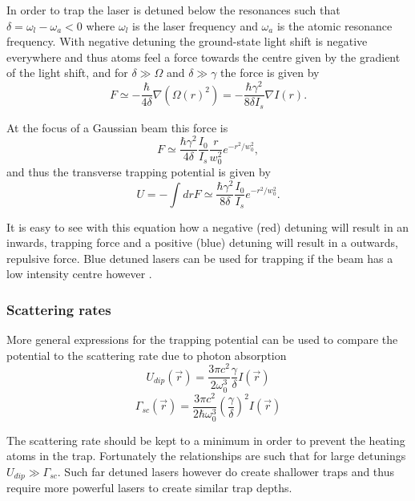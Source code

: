 In order to trap the laser is detuned below the resonances such that $\delta = \omega_l - \omega_a < 0$ where $\omega_l$ is the laser frequency and $\omega_a$ is the atomic resonance frequency. With negative detuning the ground-state light shift is negative everywhere and thus atoms feel a force towards the centre given by the gradient of the light shift, and for $\delta \gg \Omega$ and $\delta \gg \gamma$ the force is given by
\begin{equation}
F \simeq - \frac{\hbar}{4\delta} \nabla(\Omega(r)^2) = -\frac{\hbar \gamma^2}{8\delta I_s} \nabla I (r).
\end{equation}

At the focus of a Gaussian beam this force is
\begin{equation}
F \simeq \frac{\hbar \gamma^2}{4 \delta} \frac{I_0}{I_s} \frac{r}{w_0^2} e^{-r^2/w_0^2},
\end{equation}
and thus the transverse trapping potential is given by
\begin{equation}
U = -\int dr F \simeq \frac{\hbar \gamma^2}{8\delta} \frac{I_0}{I_s} e^{-r^2/w_0^2}.
\end{equation}

It is easy to see with this equation how a negative (red) detuning will result in an inwards, trapping force and a positive (blue) detuning will result in a outwards, repulsive force. Blue detuned lasers can be used for trapping if the beam has a low intensity centre however \cite{davidson_long_1995, lee_raman_1996, ozeri_long_1999, friedman_compression_2000}.

\subsubsection{Scattering rates}
More general expressions for the trapping potential can be used to compare the potential to the scattering rate due to photon absorption \cite{grimm_optical_2000}
\begin{equation}
U_{dip}(\vec{r})=\frac{3\pi c^2}{2\omega_0^3} \frac{\gamma}{\delta} I(\vec{r})
\end{equation}
\begin{equation}
\Gamma_{sc}(\vec{r})=\frac{3\pi c^2}{2\hbar \omega_0^3}\left(\frac{\gamma}{\delta}\right)^2 I(\vec{r})
\end{equation}

The scattering rate should be kept to a minimum in order to prevent the heating atoms in the trap. Fortunately the relationships are such that for large detunings $U_{dip}\gg\Gamma_{sc}$. Such far detuned lasers however do create shallower traps and thus require more powerful lasers to create similar trap depths.

